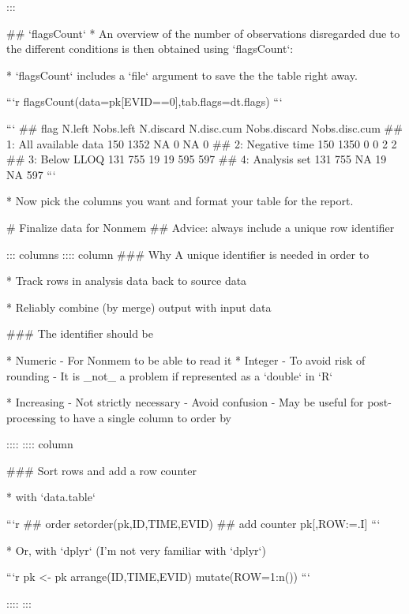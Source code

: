 :::


## `flagsCount`
* An overview of the number of observations disregarded due to the
different conditions is then obtained using `flagsCount`:

* `flagsCount` includes a `file` argument to save the the table right
away.



\footnotesize

```r
flagsCount(data=pk[EVID==0],tab.flags=dt.flags)
```

```
##                  flag N.left Nobs.left N.discard N.disc.cum Nobs.discard Nobs.disc.cum
## 1: All available data    150      1352        NA          0           NA             0
## 2:      Negative time    150      1350         0          0            2             2
## 3:         Below LLOQ    131       755        19         19          595           597
## 4:       Analysis set    131       755        NA         19           NA           597
```



* Now pick the columns you want and format your table for the report.


# Finalize data for Nonmem 
## Advice: always include a unique row identifier

::: columns
:::: column
### Why
A unique identifier is needed in order to

* Track rows in analysis data back to source data

* Reliably combine (by merge) output with input data

### The identifier should be

* Numeric
- For Nonmem to be able to read it
* Integer
- To avoid risk of rounding
- It is _not_ a problem if represented as a `double` in `R`

* Increasing
- Not strictly necessary
- Avoid confusion
- May be useful for post-processing to have a single column to order by

::::
:::: column

### Sort rows and add a row counter 

* with `data.table`

```r
## order
setorder(pk,ID,TIME,EVID)
## add counter
pk[,ROW:=.I]
```

* Or, with `dplyr` (I'm not very familiar with `dplyr`)

```r
pk <- pk %
    arrange(ID,TIME,EVID) %
    mutate(ROW=1:n())
```

::::
:::


